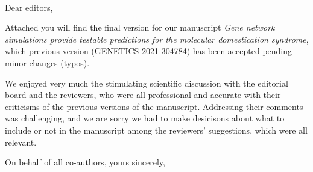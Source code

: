 \documentclass[12pt]{lettre}
\begin{document}

\begin{letter}{~}

\nodate
\nolieu

\def\concname{Subject:~}

\opening{Dear editors, }

Attached you will find the final version for our manuscript \emph{Gene network simulations provide testable predictions for the
molecular domestication syndrome}, which previous version (GENETICS-2021-304784) has been accepted pending minor changes (typos). 

We enjoyed very much the stimulating scientific discussion with the editorial board and the reviewers, who were all professional and accurate with their criticisms of the previous versions of the manuscript. Addressing their comments was challenging, and we are sorry we had to make desicisons about what to include or not in the manuscript among the reviewers' suggestions, which were all relevant. 

\closing{On behalf of all co-authors, yours sincerely,}

\end{letter}
\end{document}
